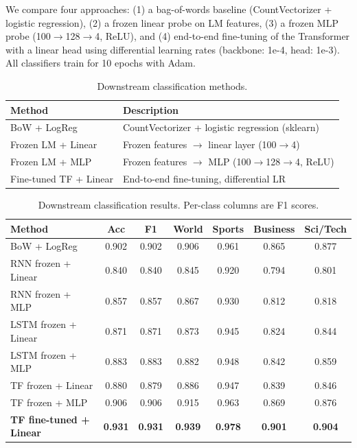 \documentclass[11pt,a4paper]{article}
\begin{document}
We compare four approaches: (1) a bag-of-words baseline (CountVectorizer + logistic regression), (2) a frozen linear probe on LM features, (3) a frozen MLP probe (100$\rightarrow$128$\rightarrow$4, ReLU), and (4) end-to-end fine-tuning of the Transformer with a linear head using differential learning rates (backbone: 1e-4, head: 1e-3). All classifiers train for 10 epochs with Adam.

\begin{table}[H]
\centering\small
\begin{tabular}{ll}
\toprule
\textbf{Method} & \textbf{Description} \\
\midrule
BoW + LogReg & CountVectorizer + logistic regression (sklearn) \\
Frozen LM + Linear & Frozen features $\rightarrow$ linear layer (100$\rightarrow$4) \\
Frozen LM + MLP & Frozen features $\rightarrow$ MLP (100$\rightarrow$128$\rightarrow$4, ReLU) \\
Fine-tuned TF + Linear & End-to-end fine-tuning, differential LR \\
\bottomrule
\end{tabular}
\caption{Downstream classification methods.}
\end{table}

\begin{table}[H]
\centering\small
\begin{tabular}{lcccccc}
\toprule
\textbf{Method} & \textbf{Acc} & \textbf{F1} & \textbf{World} & \textbf{Sports} & \textbf{Business} & \textbf{Sci/Tech} \\
\midrule
BoW + LogReg & 0.902 & 0.902 & 0.906 & 0.961 & 0.865 & 0.877 \\
RNN frozen + Linear & 0.840 & 0.840 & 0.845 & 0.920 & 0.794 & 0.801 \\
RNN frozen + MLP & 0.857 & 0.857 & 0.867 & 0.930 & 0.812 & 0.818 \\
LSTM frozen + Linear & 0.871 & 0.871 & 0.873 & 0.945 & 0.824 & 0.844 \\
LSTM frozen + MLP & 0.883 & 0.883 & 0.882 & 0.948 & 0.842 & 0.859 \\
TF frozen + Linear & 0.880 & 0.879 & 0.886 & 0.947 & 0.839 & 0.846 \\
TF frozen + MLP & 0.906 & 0.906 & 0.915 & 0.963 & 0.869 & 0.876 \\
\textbf{TF fine-tuned + Linear} & \textbf{0.931} & \textbf{0.931} & \textbf{0.939} & \textbf{0.978} & \textbf{0.901} & \textbf{0.904} \\
\bottomrule
\end{tabular}
\caption{Downstream classification results. Per-class columns are F1 scores.}
\end{table}
\end{document}
